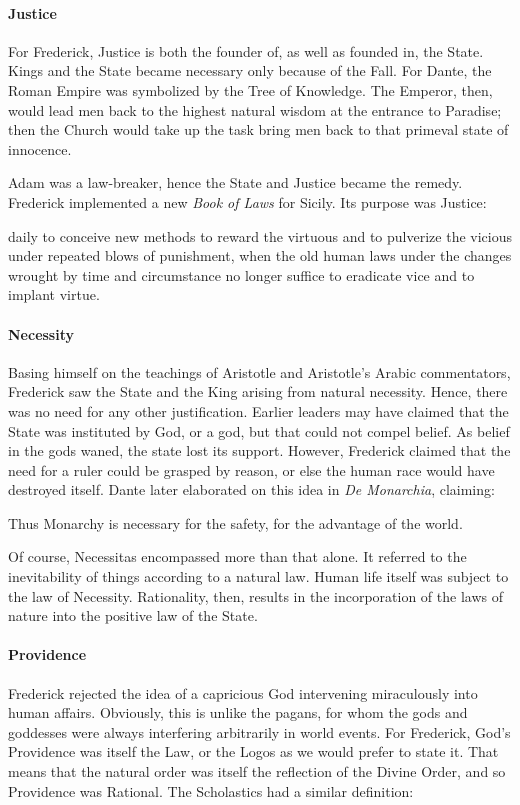 \paragraph{Justice}
For Frederick, Justice is both the founder of, as well as founded in, the State. Kings and the State became necessary only because of the Fall. For Dante, the Roman Empire was symbolized by the Tree of Knowledge. The Emperor, then, would lead men back to the highest natural wisdom at the entrance to Paradise; then the Church would take up the task bring men back to that primeval state of innocence.

Adam was a law-breaker, hence the State and Justice became the remedy. Frederick implemented a new \emph{Book of Laws} for Sicily. Its purpose was Justice:

\begin{quotex}
daily to conceive new methods to reward the virtuous and to pulverize the vicious under repeated blows of punishment, when the old human laws under the changes wrought by time and circumstance no longer suffice to eradicate vice and to implant virtue. 

\end{quotex}
\paragraph{Necessity}
Basing himself on the teachings of Aristotle and Aristotle's Arabic commentators, Frederick saw the State and the King arising from natural necessity. Hence, there was no need for any other justification. Earlier leaders may have claimed that the State was instituted by God, or a god, but that could not compel belief. As belief in the gods waned, the state lost its support. However, Frederick claimed that the need for a ruler could be grasped by reason, or else the human race would have destroyed itself. Dante later elaborated on this idea in \emph{De Monarchia}, claiming:

\begin{quotex}
Thus Monarchy is necessary for the safety, for the advantage of the world. 

\end{quotex}
Of course, Necessitas encompassed more than that alone. It referred to the inevitability of things according to a natural law. Human life itself was subject to the law of Necessity. Rationality, then, results in the incorporation of the laws of nature into the positive law of the State.

\paragraph{Providence}
Frederick rejected the idea of a capricious God intervening miraculously into human affairs. Obviously, this is unlike the pagans, for whom the gods and goddesses were always interfering arbitrarily in world events. For Frederick, God's Providence was itself the Law, or the Logos as we would prefer to state it. That means that the natural order was itself the reflection of the Divine Order, and so Providence was Rational. The Scholastics had a similar definition:

